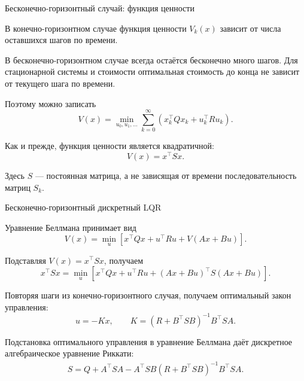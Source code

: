 \documentclass{beamer}
\begin{document}
	\begin{frame}{Бесконечно-горизонтный случай: функция ценности}
		\begin{flushleft}
			
			В конечно-горизонтном случае функция ценности $V_k(x)$
			зависит от числа оставшихся шагов по времени.
			
			\medskip
			
			В бесконечно-горизонтном случае всегда остаётся бесконечно
			много шагов. Для стационарной системы и
			стоимости оптимальная стоимость до конца не зависит от
			текущего шага по времени.
			
			\medskip
			
			Поэтому можно записать
			\[
			V(x)=\min_{u_0,u_1,\ldots}
			\sum_{k=0}^{\infty}
			\left(x_k^\top Qx_k+u_k^\top Ru_k\right).
			\]
			
			\medskip
			
			Как и прежде, функция ценности является квадратичной:
			\[
			\boxed{V(x)=x^\top Sx.}
			\]
			
			Здесь $S$ — постоянная матрица, а не
			зависящая от времени последовательность матриц $S_k$.
			
		\end{flushleft}
	\end{frame}
	
	\begin{frame}{Бесконечно-горизонтный дискретный LQR}
		\begin{flushleft}
			
			Уравнение Беллмана принимает вид
			\[
			V(x)=\min_u
			\left[
			x^\top Qx+u^\top Ru+V(Ax+Bu)
			\right].
			\]
			
			Подставляя $V(x)=x^\top Sx$, получаем
			\[
			x^\top Sx=\min_u
			\left[
			x^\top Qx+u^\top Ru
			+(Ax+Bu)^\top S(Ax+Bu)
			\right].
			\]
			
			\medskip
			
			Повторяя шаги из конечно-горизонтного случая, получаем
			оптимальный закон управления:
			\[
			\boxed{
				u=-Kx,
				\qquad
				K=(R+B^\top SB)^{-1}B^\top SA.
			}
			\]
			
			\medskip
			
			Подстановка оптимального управления в уравнение Беллмана
			даёт дискретное алгебраическое уравнение
			Риккати:
			\[
			\boxed{
				\begin{aligned}
					S= Q+A^\top SA -A^\top SB(R+B^\top SB)^{-1}B^\top SA.
				\end{aligned}
			}
			\]
			
		\end{flushleft}
	\end{frame}
	
\end{document}
